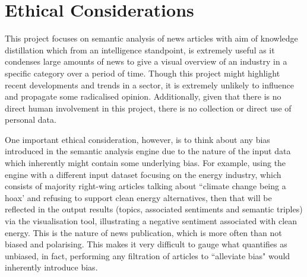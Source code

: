 

\section{Ethical Considerations} 
This project focuses on semantic analysis of news articles with aim of knowledge distillation which from an intelligence standpoint, is extremely useful as it condenses large amounts of news to give a visual overview of an industry in a specific category over a period of time. Though this project might highlight recent developments and trends in a sector, it is extremely unlikely to influence and propagate some radicalised opinion. Additionally, given that there is no direct human involvement in this project, there is no collection or direct use of personal data.

One important ethical consideration, however, is to think about any bias introduced in the semantic analysis engine due to the nature of the input data which inherently might contain some underlying bias. For example, using the engine with a different input dataset focusing on the energy industry, which consists of majority right-wing articles talking about ``climate change being a hoax' and refusing to support clean energy alternatives, then that will be reflected in the output results (topics, associated sentiments and semantic triples) via the visualisation tool, illustrating a negative sentiment associated with clean energy. This is the nature of news publication, which is more often than not biased and polarising. This makes it very difficult to gauge what quantifies as unbiased, in fact, performing any filtration of articles to ``alleviate bias" would inherently introduce bias.

